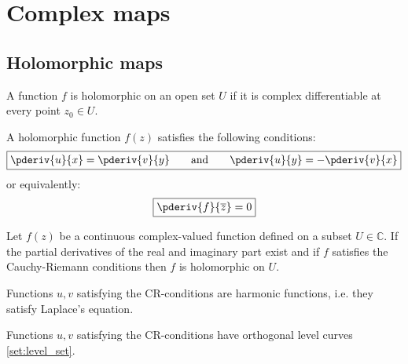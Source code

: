 \section{Complex maps}
\subsection{Holomorphic maps}

        \begin{definition}[Holomorphic]
	        A function $f$ is holomorphic on an open set $U$ if it is complex differentiable at every point $z_0\in U$. 
        \end{definition}
        
        \begin{property}
	        A holomorphic function $f(z)$ satisfies the following conditions:
	        \begin{gather}
	                \label{complexcalculus:cauchy_riemann}
	                \boxed{\pderiv{u}{x} = \pderiv{v}{y} \text{\qquad and\qquad} \pderiv{u}{y} = -\pderiv{v}{x}}
	        \end{gather}
	        or equivalently:
	        \begin{gather}
	                \label{complexcalculus:holomorphic_alternative_condition}
	                \boxed{\pderiv{f}{\overline{z}} = 0}
	        \end{gather}
        \end{property}
        
        \begin{theorem}
        	Let $f(z)$ be a continuous complex-valued function defined on a subset $U\in\mathbb{C}$. If the partial derivatives of the real and imaginary part exist and if $f$ satisfies the Cauchy-Riemann conditions then $f$ is holomorphic on $U$.
        \end{theorem}

	\begin{property}
		Functions $u,v$ satisfying the CR-conditions are harmonic functions, i.e. they satisfy Laplace's equation.
	\end{property}
	\begin{property}
		Functions $u,v$ satisfying the CR-conditions have orthogonal level curves \ref{set:level_set}.
	\end{property}
	
